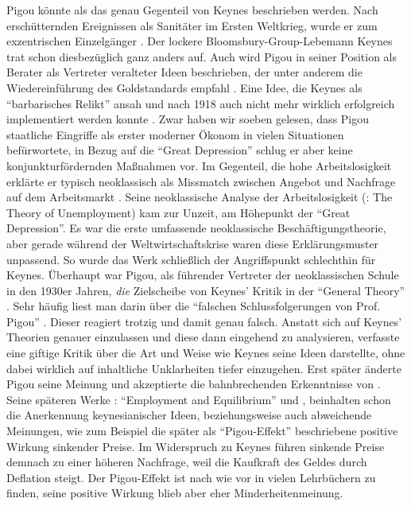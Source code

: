 Pigou könnte als das genau Gegenteil von Keynes beschrieben werden. Nach erschütternden Ereignissen als Sanitäter im Ersten Weltkrieg, wurde er zum exzentrischen Einzelgänger \parencite[S. 153]{Johnson1960}. Der lockere Bloomsbury-Group-Lebemann Keynes trat schon diesbezüglich ganz anders auf. Auch wird Pigou in seiner Position als Berater als Vertreter veralteter Ideen beschrieben, der unter anderem die Wiedereinführung des Goldstandards empfahl \parencite[S. 232]{Cansier1989}. Eine Idee, die Keynes als "`barbarisches Relikt"' ansah und nach 1918 auch nicht mehr wirklich erfolgreich implementiert werden konnte \parencite[S. 232]{Cansier1989}. Zwar haben wir soeben gelesen, dass Pigou staatliche Eingriffe als erster moderner Ökonom in vielen Situationen befürwortete, in Bezug auf die "`Great Depression"' schlug er aber keine konjunkturfördernden Maßnahmen vor. Im Gegenteil, die hohe Arbeitslosigkeit erklärte er typisch neoklassisch als Missmatch zwischen Angebot und Nachfrage auf dem Arbeitsmarkt \parencite[S. 232]{Cansier1989}. Seine neoklassische Analyse der Arbeitslosigkeit (\textcite{Pigou1933}: The Theory of Unemployment) kam zur Unzeit, am Höhepunkt der "`Great Depression"'. Es war die erste umfassende neoklassische Beschäftigungstheorie, aber gerade während der Weltwirtschaftskrise waren diese Erklärungsmuster unpassend. So wurde das Werk schließlich der Angriffspunkt schlechthin für Keynes. Überhaupt war Pigou, als führender Vertreter der neoklassischen Schule in den 1930er Jahren, \textit{die} Zielscheibe von Keynes' Kritik in der "`General Theory"' \parencite[S. 154]{Johnson1960}. Sehr häufig liest man darin über die "`falschen Schlussfolgerungen von Prof. Pigou"' \parencite[S. 73]{Keynes1936}. Dieser reagiert trotzig und damit genau falsch. Anstatt sich auf Keynes' Theorien genauer einzulassen und diese dann eingehend zu analysieren, verfasste \textcite{Pigou1936} eine giftige Kritik über die Art und Weise wie Keynes seine Ideen darstellte, ohne dabei wirklich auf inhaltliche Unklarheiten tiefer einzugehen. Erst später änderte Pigou seine Meinung und akzeptierte die bahnbrechenden Erkenntnisse von \textcite{Keynes1936} \parencite[S. 154]{Johnson1960}. Seine späteren Werke \textcite{Pigou1941}: "`Employment and Equilibrium"' und \textcite{Pigou1943}, beinhalten schon die Anerkennung keynesianischer Ideen, beziehungsweise auch abweichende Meinungen, wie zum Beispiel die später als "`Pigou-Effekt"' beschriebene positive Wirkung sinkender Preise. Im Widerspruch zu Keynes führen sinkende Preise demnach zu einer höheren Nachfrage, weil die Kaufkraft des Geldes durch Deflation steigt. Der Pigou-Effekt ist nach wie vor in vielen Lehrbüchern zu finden, seine positive Wirkung blieb aber eher Minderheitenmeinung.

